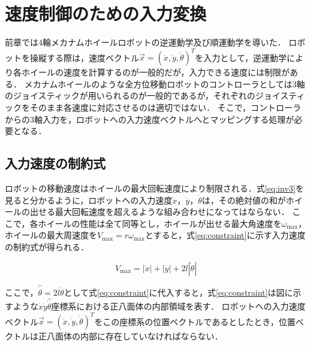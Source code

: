 \section{速度制御のための入力変換}

前章では4輪メカナムホイールロボットの逆運動学及び順運動学を導いた．
ロボットを操縦する際は，速度ベクトル$\vec{x} = (\dot{x}, \dot{y}, \dot{\theta})^T$を入力として，逆運動学により各ホイールの速度を計算するのが一般的だが，入力できる速度には制限がある．
メカナムホイールのような全方位移動ロボットのコントローラとしては3軸のジョイスティックが用いられるのが一般的であるが，それぞれのジョイスティックをそのまま各速度に対応させるのは適切ではない．
そこで，コントローラからの3軸入力を，ロボットへの入力速度ベクトルへとマッピングする処理が必要となる．

\subsection{入力速度の制約式}

ロボットの移動速度はホイールの最大回転速度により制限される．式\ref{eq:inv3}を見ると分かるように，ロボットへの入力速度$\dot{x}$，$\dot{y}$，$\dot{\theta}$は，その絶対値の和がホイールの出せる最大回転速度を超えるような組み合わせになってはならない．
ここで，各ホイールの性能は全て同等とし，ホイールが出せる最大角速度を$\omega_{\text{max}}$，ホイールの最大周速度を$V_{\text{max}} = r \omega_{\text{max}}$とすると，式\ref{eq:constraint}に示す入力速度の制約式が得られる．

\begin{equation}
  V_{\text{max}} = |\dot{x}| + |\dot{y}| + 2l|\dot{\theta}|
  \label{eq:constraint}
\end{equation}

ここで，$\hat{\dot{\theta}} = 2l\dot{\theta}$として式\ref{eq:constraint}に代入すると，式\ref{eq:constraint}は図に示すような$\dot{x}\dot{y}\hat{\dot{\theta}}$座標系における正八面体の内部領域を表す．
ロボットへの入力速度ベクトル$\vec{x} = (\dot{x}, \dot{y}, \dot{\theta})^T$をこの座標系の位置ベクトルであるとしたとき，位置ベクトルは正八面体の内部に存在していなければならない．

